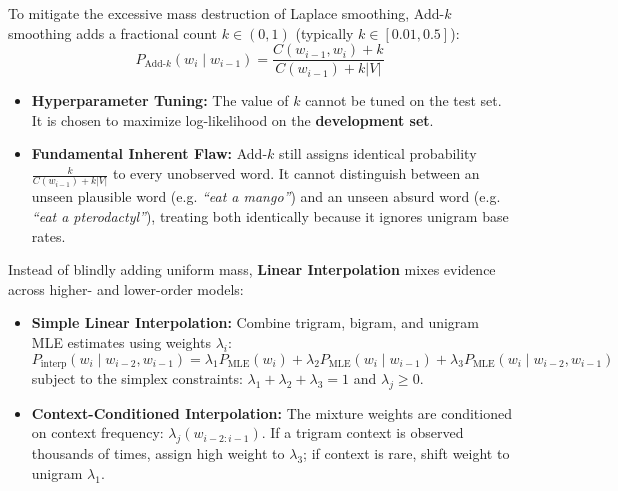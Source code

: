 \documentclass[10pt,a4paper]{article}
\begin{document}
\par\vspace{1pt}
To mitigate the excessive mass destruction of Laplace smoothing, Add-$k$ smoothing adds a fractional count $k \in (0, 1)$ (typically $k \in [0.01, 0.5]$):
\[
P_{\text{Add-}k}(w_i \mid w_{i-1}) = \frac{C(w_{i-1}, w_i) + k}{C(w_{i-1}) + k|V|}
\]
\begin{itemize}[leftmargin=12pt, itemsep=0.5pt, parsep=0pt, topsep=0.5pt]
    \item \textbf{Hyperparameter Tuning:} The value of $k$ cannot be tuned on the test set. It is chosen to maximize log-likelihood on the \textbf{development set}.
    \item \textbf{Fundamental Inherent Flaw:} Add-$k$ still assigns identical probability $\frac{k}{C(w_{i-1}) + k|V|}$ to every unobserved word. It cannot distinguish between an unseen plausible word (e.g. \textit{``eat a mango''}) and an unseen absurd word (e.g. \textit{``eat a pterodactyl''}), treating both identically because it ignores unigram base rates.
\end{itemize}

\vspace{-2pt}

\par\vspace{1pt}
Instead of blindly adding uniform mass, \textbf{Linear Interpolation} mixes evidence across higher- and lower-order models:
\begin{itemize}[leftmargin=12pt, itemsep=0.5pt, parsep=0pt, topsep=0.5pt]
    \item \textbf{Simple Linear Interpolation:} Combine trigram, bigram, and unigram MLE estimates using weights $\lambda_i$:
    \[
    P_{\text{interp}}(w_i \mid w_{i-2}, w_{i-1}) = \lambda_1 P_{\text{MLE}}(w_i) + \lambda_2 P_{\text{MLE}}(w_i \mid w_{i-1}) + \lambda_3 P_{\text{MLE}}(w_i \mid w_{i-2}, w_{i-1})
    \]
    subject to the simplex constraints: $\lambda_1 + \lambda_2 + \lambda_3 = 1$ and $\lambda_j \ge 0$.
    \item \textbf{Context-Conditioned Interpolation:} The mixture weights are conditioned on context frequency: $\lambda_j(w_{i-2:i-1})$. If a trigram context is observed thousands of times, assign high weight to $\lambda_3$; if context is rare, shift weight to unigram $\lambda_1$.
\end{itemize}
\end{document}
